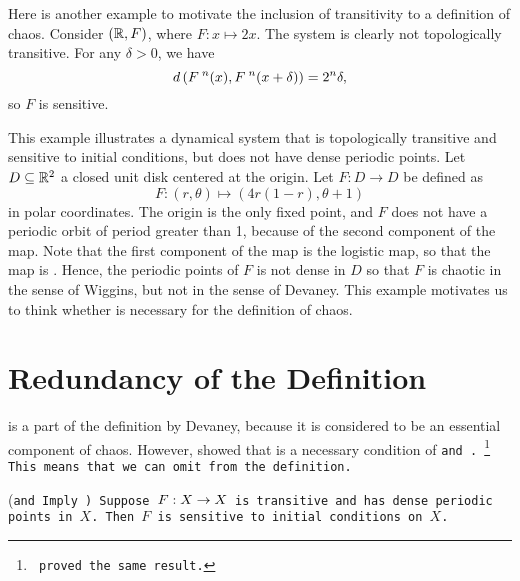 \documentclass[10pt,draft,twoside]{book}
\begin{document}
\begin{example}
  Here is another example to motivate the inclusion of transitivity to a definition of chaos.
  Consider $(\mathbb{R}, F)$, where $F: x \mapsto 2x$.
  The system is clearly not topologically transitive.
  For any $\delta > 0$, we have
  \begin{equation*}
    d\left( F^{\;n}(x), F^{\;n}(x+\delta) \right) = 2^n \delta,
  \end{equation*}
  so $F$ is sensitive.
\end{example}
\begin{example}
  \citep{martelli}
  This example illustrates a dynamical system that is topologically transitive and sensitive to initial conditions, but does not have dense periodic points.
  Let $D \subseteq \mathbb{R}^2$ a closed unit disk centered at the origin.
  Let $F: D \to D$ be defined as
  \begin{equation*}
    F: (r, \theta) \mapsto (4r(1 - r), \theta + 1)
  \end{equation*}
  in polar coordinates.
  The origin is the only fixed point, and $F$ does not have a periodic orbit of period greater than 1, because of the second component of the map.
  Note that the first component of the map is the logistic map, so that the map is \sdic.
  Hence, the periodic points of $F$ is not dense in $D$ so that $F$ is chaotic in the sense of Wiggins, but not in the sense of Devaney.
  This example motivates us to think whether \dpp is necessary for the definition of chaos.
  \label{eg:notdpp}
\end{example}

\section{Redundancy of the Definition}
\sdic is a part of the definition by Devaney, because it is considered to be an essential component of chaos.
However, \citet{silverman} showed that \sdic is a necessary condition of \tt and \dpp.
\footnote{\citet{banks} proved the same result.}
This means that we can omit \sdic from the definition.
\begin{theorem}
  (\tt and \dpp Imply \sdic)
  Suppose $F: X\rightarrow X$ is transitive and has dense periodic points in $X$.
  Then $F$ is sensitive to initial conditions on $X$.
  \label{thm:silverman}
\end{theorem}
\end{document}
